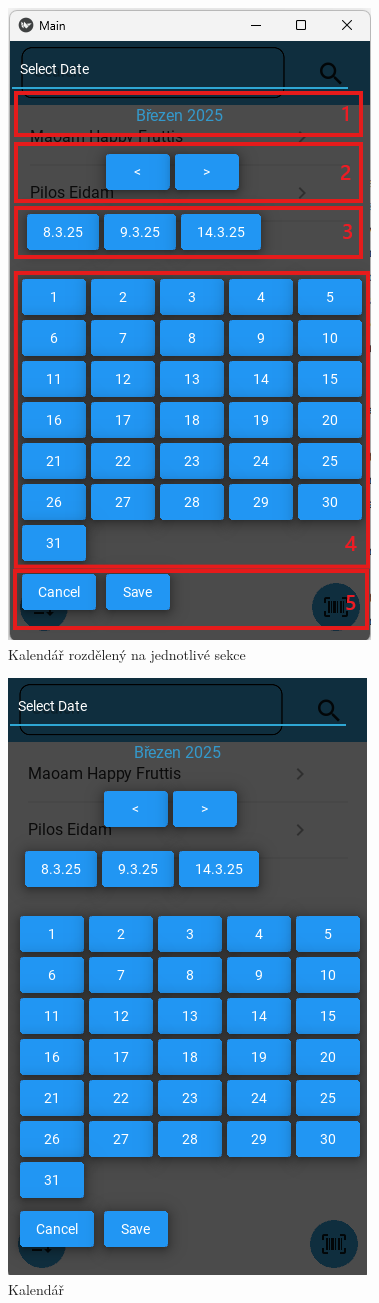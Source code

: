 \documentclass[12pt, a4paper, oneside]{report}
\begin{document}
\begin{figure}[t!]
    \centering
    \includegraphics[width=0.4\linewidth]{obrazky/datepickerUpraveneNaSekce.png}
    \caption{Kalendář rozdělený na jednotlivé sekce}
    \label{fig:datepickerSekce}
\end{figure}

\begin{figure}[b!]
    \centering
    \includegraphics[width=0.4\linewidth]{obrazky/datepicker.png}
    \caption{Kalendář}
    \label{fig:datepicker}
\end{figure}
\end{document}
